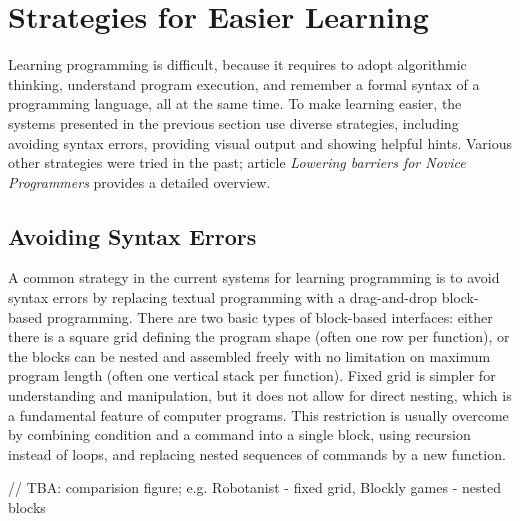 

\section{Strategies for Easier Learning}
\label{sec:strategies-for-easier-learning}

Learning programming is difficult,
  because it requires
  to adopt algorithmic thinking,
  understand program execution,
  and remember a formal syntax of a programming language,
  all at the same time.
To make learning easier,
  the systems presented in the previous section use diverse strategies,
  including avoiding syntax errors,
  providing visual output
  and showing helpful hints.
Various other strategies were tried in the past;
article \emph{Lowering barriers for Novice Programmers}
  \cite{lowering-barriers}
  provides a detailed overview.


\subsection{Avoiding Syntax Errors}
\label{sec:avoiding-syntax-errors}

A common strategy in the current systems for learning programming is to avoid syntax errors
  by replacing textual programming with a drag-and-drop block-based programming.
There are two basic types of block-based interfaces:
  either there is a square grid defining the program shape
  (often one row per function),
  or the blocks can be nested and assembled freely with no limitation on maximum program length
  (often one vertical stack per function).
Fixed grid is simpler for understanding and manipulation,
  but it does not allow for direct nesting,
  which is a fundamental feature of computer programs.
This restriction is usually overcome by
  combining condition and a command into a single block,
  using recursion instead of loops,
  and replacing nested sequences of commands by a new function.

// TBA: comparision figure; e.g. Robotanist - fixed grid, Blockly games - nested blocks


